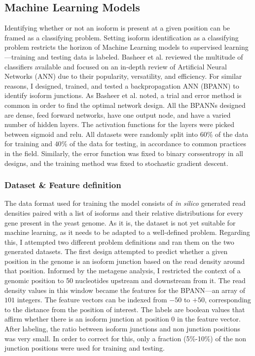 \documentclass[12pt]{article}
\begin{document}
\subsection{Machine Learning Models}

Identifying whether or not an isoform is present at a given position can be framed as a classifying problem. Setting isoform identification as a classifying problem restricts the horizon of Machine Learning models to supervised learning---training and testing data is labeled. Basheer et al. \cite{Basheer2000} reviewed the multitude of classifiers available and focused on an in-depth review of Artificial Neural Networks (ANN) due to their popularity, versatility, and efficiency. For similar reasons, I designed, trained, and tested a backpropagation ANN (BPANN) \cite{Leonard1990} to identify isoform junctions. As Basheer et al. \cite{Basheer2000} noted, a trial and error method is common in order to find the optimal network design. All the BPANNs designed are dense, feed forward networks, have one output node, and have a varied number of hidden layers. The activation functions for the layers were picked between sigmoid and relu. All datasets were randomly split into $60\%$ of the data for training and $40\%$ of the data for testing, in accordance to common practices in the field. Similarly, the error function was fixed to binary corssentropy in all designs, and the training method was fixed to stochastic gradient descent. 


\subsubsection{Dataset \& Feature definition}

The data format used for training the model consists of \textit{in silico} generated read densities paired with a list of isoforms and their relative distributions for every gene present in the yeast genome. As it is, the dataset is not yet suitable for machine learning, as it needs to be adapted to a well-defined problem. Regarding this, I attempted two different problem definitions and ran them on the two generated datasets. 
The first design attempted to predict whether a given position in the genome is an isoform junction based on the read density around that position. Informed by the metagene analysis, I restricted the context of a genomic position to 50 nucleotides upstream and downstream from it. The read density values in this window became the features for the BPANN---an array of $101$ integers. The feature vectors can be indexed from $-50$ to $+50$, corresponding to the distance from the position of interest. The labels are boolean values that affirm whether there is an isoform junction at position $0$ in the feature vector. After labeling, the ratio between isoform junctions and non junction positions was very small. In order to correct for this, only a fraction (5\%-10\%) of the non junction positions were used for training and testing. 
\end{document}
